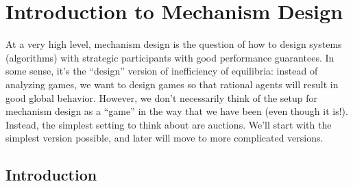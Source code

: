 \chapter{Introduction to Mechanism Design}
At a very high level, mechanism design is the question of how to design systems (algorithms) with strategic participants with good performance guarantees. In some sense, it's the “design” version of inefficiency of equilibria: instead of analyzing games, we want to design games so that rational agents will result in good global behavior. However, we don't necessarily think of the setup for mechanism design as a “game” in the way that we have been (even though it is!). Instead, the simplest setting to think about are auctions. We'll start with the simplest version possible, and later will move to more complicated versions.

\section{Introduction}